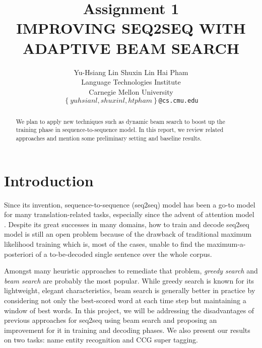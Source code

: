 \documentclass[11pt,a4paper]{article}
\title{Assignment 1\\IMPROVING SEQ2SEQ WITH ADAPTIVE BEAM SEARCH}
\author{Yu-Hsiang Lin \quad Shuxin Lin \quad Hai Pham \\
  Language Technologies Institute \\
  Carnegie Mellon University \\
{\tt\small $\left\{yuhsianl, shuxinl, htpham\right\}$@cs.cmu.edu}
  }
\date{}
\begin{document}
\maketitle
\begin{abstract}
  We plan to apply new techniques such as dynamic beam search to boost up the training phase in sequence-to-sequence model. In this report, we review related approaches and mention some preliminary setting and baseline results. 
\end{abstract}

\section{Introduction} \label{sec:introduction}
Since its invention, sequence-to-sequence (seq2seq) model \cite{seq2seq_2014} has been a go-to model for many translation-related tasks,  %
especially since the advent of attention model \cite{bahdanau2014neural,luong2015effective}. Despite its great successes in many domains, how to train and decode seq2seq model is still an open problem because of the drawback of traditional maximum likelihood training which is, most of the cases, unable to find the maximum-a-posteriori of a to-be-decoded single sentence over the whole corpus. 

Amongst many heuristic approaches to remediate that problem, \textit{greedy search} and \textit{beam search} are probably the most popular. While greedy search is known for its lightweight, elegant characteristics, beam search is generally better in practice by considering not only the best-scored word at each time step but maintaining a window of best words. 
In this project, we will be addressing the disadvantages of previous approaches for seq2seq using beam search and proposing an improvement for it in training and decoding phases. We also present our results on two tasks: name entity recognition and CCG super tagging. 

\end{document}
